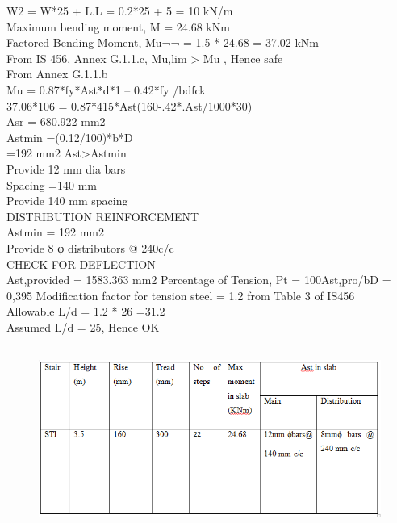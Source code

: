 W2 = W*25 + L.L = 0.2*25 + 5 = 10 kN/m\\
Maximum bending moment, M = 24.68 kNm\\
Factored Bending Moment, Mu¬¬ = 1.5 * 24.68 = 37.02 kNm\\
From IS 456, Annex G.1.1.c, Mu,lim > Mu , Hence safe\\
From Annex G.1.1.b\\
Mu = 0.87*fy*Ast*d*{1 – 0.42*fy /bdfck}\\
37.06*106           = 0.87*415*Ast(160-.42*.Ast/1000*30)\\ 
Asr                         = 680.922 mm2\\
Astmin                 =(0.12/100)*b*D\\ 
=192 mm2
Ast>Astmin\\
Provide 12 mm dia bars\\
Spacing             =140 mm\\
Provide 140 mm spacing\\

DISTRIBUTION REINFORCEMENT\\
Astmin                 = 192 mm2 \\
Provide 8 φ distributors @ 240c/c\\ 
CHECK FOR DEFLECTION\\
Ast,provided = 1583.363 mm2
Percentage of Tension, Pt = 100Ast,pro/bD = 0,395%
Modification factor for tension steel = 1.2 from Table 3 of IS456\\
Allowable L/d = 1.2 * 26 =31.2\\
Assumed L/d = 25, Hence OK\\
 \begin{figure}[H]
	
	\centering
	\includegraphics[width=\linewidth,height=6cm] {./images/stair.png}
	
	\label{manual}
\end{figure}

